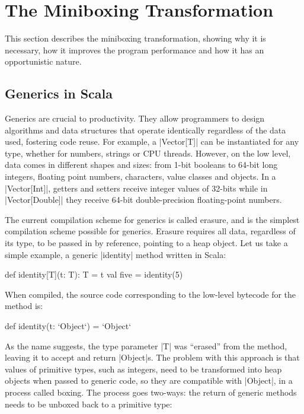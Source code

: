 \section{The Miniboxing Transformation}
\label{sec:minibox}

This section describes the miniboxing transformation, showing why it is necessary, how it improves the program performance and how it has an opportunistic nature.

\subsection{Generics in Scala}

Generics are crucial to productivity. They allow programmers to design algorithms and data structures that operate identically regardless of the data used, fostering code reuse. For example, a |Vector[T]| can be instantiated for any type, whether for numbers, strings or CPU threads. However, on the low level, data comes in different shapes and sizes: from 1-bit booleans to 64-bit long integers, floating point numbers, characters, value classes \cite{gosling-value-classes,rose-value-classes-tearing,sip-value-classes} and objects. In a |Vector[Int]|, getters and setters receive integer values of 32-bits while in |Vector[Double]| they receive 64-bit double-precision floating-point numbers.

The current compilation scheme for generics is called erasure, and is the simplest compilation scheme possible for generics. Erasure requires all data, regardless of its type, to be passed in by reference, pointing to a heap object. Let us take a simple example, a generic |identity| method written in Scala:

\begin{lstlisting-nobreak}
 def identity[T](t: T): T = t
 val five = identity(5)
\end{lstlisting-nobreak}

When compiled, the source code corresponding to the low-level bytecode for the method is:

\begin{lstlisting-nobreak}
 def identity(t: `Object`) = `Object`
\end{lstlisting-nobreak}

As the name suggests, the type parameter |T| was ``erased'' from the method, leaving it to accept and return |Object|s. The problem with this approach is that values of primitive types, such as integers, need to be transformed into heap objects when passed to generic code, so they are compatible with |Object|, in a process called boxing. The process goes two-ways: the return of generic methods needs to be unboxed back to a primitive type:

